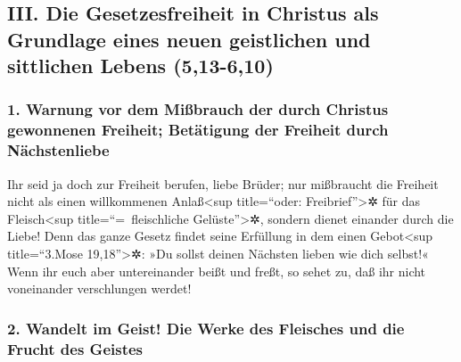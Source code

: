 \hypertarget{iii.-die-gesetzesfreiheit-in-christus-als-grundlage-eines-neuen-geistlichen-und-sittlichen-lebens-513-610}{%
\subsection{III. Die Gesetzesfreiheit in Christus als Grundlage eines
neuen geistlichen und sittlichen Lebens
(5,13-6,10)}\label{iii.-die-gesetzesfreiheit-in-christus-als-grundlage-eines-neuen-geistlichen-und-sittlichen-lebens-513-610}}

\hypertarget{warnung-vor-dem-miuxdfbrauch-der-durch-christus-gewonnenen-freiheit-betuxe4tigung-der-freiheit-durch-nuxe4chstenliebe}{%
\subsubsection{1. Warnung vor dem Mißbrauch der durch Christus
gewonnenen Freiheit; Betätigung der Freiheit durch
Nächstenliebe}\label{warnung-vor-dem-miuxdfbrauch-der-durch-christus-gewonnenen-freiheit-betuxe4tigung-der-freiheit-durch-nuxe4chstenliebe}}

 Ihr seid ja doch zur Freiheit berufen, liebe Brüder; nur
mißbraucht die Freiheit nicht als einen willkommenen Anlaß\textless sup
title=``oder: Freibrief''\textgreater✲ für das Fleisch\textless sup
title=``=~fleischliche Gelüste''\textgreater✲, sondern dienet einander
durch die Liebe!  Denn das ganze Gesetz findet seine
Erfüllung in dem einen Gebot\textless sup title=``3.Mose
19,18''\textgreater✲: »Du sollst deinen Nächsten lieben wie dich
selbst!«  Wenn ihr euch aber untereinander beißt und
freßt, so sehet zu, daß ihr nicht voneinander verschlungen werdet!

\hypertarget{wandelt-im-geist-die-werke-des-fleisches-und-die-frucht-des-geistes}{%
\subsubsection{2. Wandelt im Geist! Die Werke des Fleisches und die
Frucht des
Geistes}\label{wandelt-im-geist-die-werke-des-fleisches-und-die-frucht-des-geistes}}

